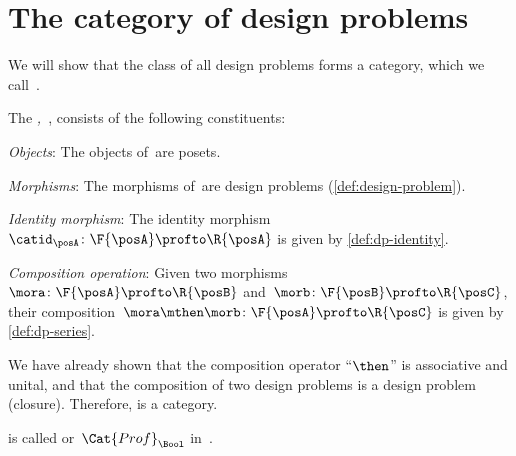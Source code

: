 \section{The category of design problems}

We will show that the class of all design problems forms a category, which we call~\iindex{\DP}.

\begin{definition}
  \label{def:DP}
  The \emph{,~\DP}, consists of the following constituents:
  \begin{compactenum}
    \item \emph{Objects}: The objects of~\DP are posets.
    \item \emph{Morphisms}: The morphisms of~\DP are design problems (\cref{def:design-problem}).
    \item \emph{Identity morphism}: The identity morphism~$\catid_\posA \colon \F{\posA} \profto \R{\posA}$ is given by \cref{def:dp-identity}.
    \item \emph{Composition operation}: Given two morphisms~$\mora \colon  \F{\posA} \profto \R{\posB}$ and~$\morb \colon \F{\posB} \profto \R{\posC}$, their
    composition~$\mora \mthen \morb\colon \F{\posA} \profto \R{\posC}$ is given by \cref{def:dp-series}.
  \end{compactenum}
\end{definition}

We have already shown that the composition operator ``$\then$'' is associative and unital, and that the composition of two design problems is a design problem (closure). Therefore, \DP is a category.

\begin{remark}
  \DP is called \feas or~$\Cat{Prof}_\Bool$ in~\cite{fong2019}.
\end{remark}
